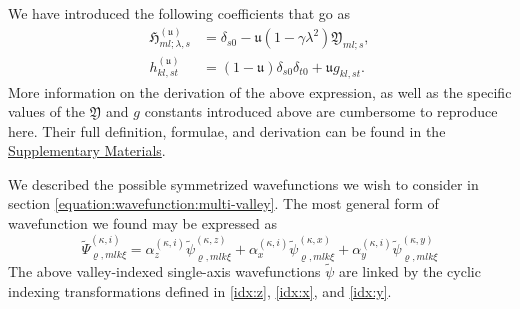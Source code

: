 We have introduced the following coefficients that go as
\begin{align}
\mathfrak{H}_{ml;\lambda,s}^{\left(\mathfrak{u}\right)}
    & =
        \delta_{s0}
            -
        \mathfrak{u}\left(1-\gamma\lambda^{2}\right)
        \mathfrak{Y}_{ml;s}
,\\
h^{\left(\mathfrak{u}\right)}_{kl,st}
    & =
        \left(1-\mathfrak{u}\right)\delta_{s0}\delta_{t0}
            +
        \mathfrak{u}g_{kl,st}
.
\end{align}
More information on the derivation of the above expression, as well as the
specific values of the $\mathfrak{Y}$ and $g$ constants introduced above are
cumbersome to reproduce here. Their full definition, formulae, and derivation
can be found in the
\href{https://gitlab.com/cantankerous-impurity/Documentation/-/tree/core/SUNY--Buffalo/Dissertation/Supplementary%20Materials?ref_type=heads}{Supplementary Materials}. 

We described the possible symmetrized wavefunctions we wish to consider in
section \ref{equation:wavefunction:multi-valley}. The most general form of
wavefunction we found may be expressed as
\begin{equation}
\tilde{\Psi}_{\varrho,mlk\xi}^{\left(\kappa,i\right)}
    =
        \alpha_{z}^{\left(\kappa,i\right)}
        \tilde{\psi}_{\varrho,mlk\xi}^{\left(\kappa,z\right)}
            +
        \alpha_{x}^{\left(\kappa,i\right)}
        \tilde{\psi}_{\varrho,mlk\xi}^{\left(\kappa,x\right)}
            +
        \alpha_{y}^{\left(\kappa,i\right)}
        \tilde{\psi}_{\varrho,mlk\xi}^{\left(\kappa,y\right)}
\end{equation}
The above valley-indexed single-axis wavefunctions $\tilde{\psi}$ are linked by
the cyclic indexing transformations defined in \eqref{idx:z}, \eqref{idx:x}, and
\eqref{idx:y}.

